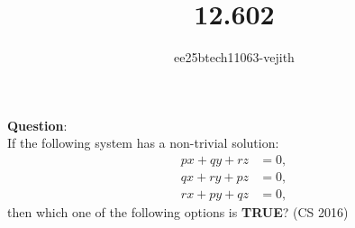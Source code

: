 \documentclass[journal]{IEEEtran}
\begin{document}

\vspace{3cm}

\title{12.602}
\author{ee25btech11063-vejith}

\maketitle
{\let\newpage\relax\maketitle}
\renewcommand{\thefigure}{\theenumi}
\renewcommand{\thetable}{\theenumi}
\setlength{\intextsep}{10pt} %
\textbf{Question}:\\
If the following system has a non-trivial solution:
\begin{align*}
px + qy + rz &= 0, \\
qx + ry + pz &= 0,\\
rx + py + qz &= 0,
\end{align*}
then which one of the following options is \textbf{TRUE}? \hfill (CS 2016)
\vspace{0.5cm}
\end{document}

